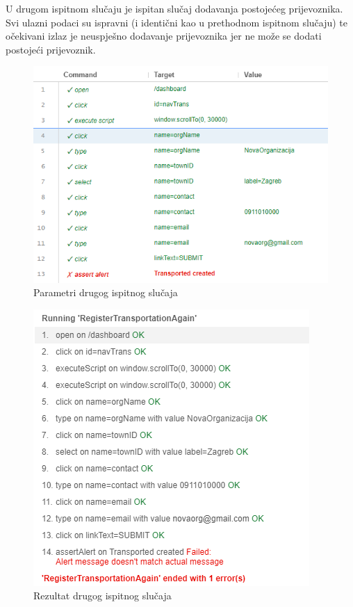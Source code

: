 			\eject
			U drugom ispitnom slučaju je ispitan slučaj dodavanja postojećeg prijevoznika. Svi ulazni podaci su ispravni (i identični kao u prethodnom ispitnom slučaju) te očekivani izlaz je neuspješno dodavanje prijevoznika jer ne može se dodati postojeći prijevoznik.
			\begin{figure}[H]
				\centering
				\includegraphics[width=\textwidth]{"slike/Selenium/transport testovi/registerTransportationAgain_parameters.png"}
				\caption{Parametri drugog ispitnog slučaja}
				\label{fig: registerTransportationAgain_parameters}
			\end{figure}
			\begin{figure}[H]
				\centering
				\includegraphics[width=\textwidth]{"slike/Selenium/transport testovi/registerTransportationAgain_results.png"}
				\caption{Rezultat drugog ispitnog slučaja}
				\label{fig: registerTransportationAgain_result}
			\end{figure}
